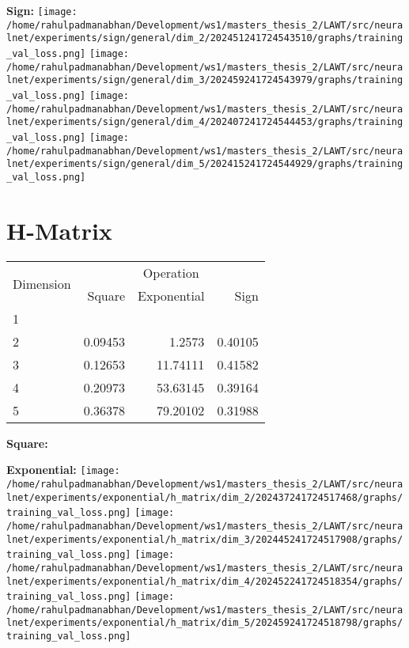 \documentclass{article}
\begin{document}
\textbf{Sign:}
\texttt{[image: /home/rahulpadmanabhan/Development/ws1/masters\_thesis\_2/LAWT/src/neuralnet/experiments/sign/general/dim\_2/202451241724543510/graphs/training\_val\_loss.png]}
\texttt{[image: /home/rahulpadmanabhan/Development/ws1/masters\_thesis\_2/LAWT/src/neuralnet/experiments/sign/general/dim\_3/202459241724543979/graphs/training\_val\_loss.png]}
\texttt{[image: /home/rahulpadmanabhan/Development/ws1/masters\_thesis\_2/LAWT/src/neuralnet/experiments/sign/general/dim\_4/202407241724544453/graphs/training\_val\_loss.png]}
\texttt{[image: /home/rahulpadmanabhan/Development/ws1/masters\_thesis\_2/LAWT/src/neuralnet/experiments/sign/general/dim\_5/202415241724544929/graphs/training\_val\_loss.png]}

\pagebreak
\section{H-Matrix}
\begin{tabular}{@{}lrrr@{}}
\toprule
\multirow{2}{*}{Dimension} & \multicolumn{3}{c}{Operation} \\
\cmidrule(l){2-4}
& Square & Exponential & Sign \\
\midrule
1 & & & \\
2 & 0.09453 & 1.2573 & 0.40105 \\
3 & 0.12653 & 11.74111 & 0.41582 \\
4 & 0.20973 & 53.63145 & 0.39164 \\
5 & 0.36378 & 79.20102 & 0.31988 \\
\bottomrule
\end{tabular}

\textbf{Square:}

\textbf{Exponential:}
\texttt{[image: /home/rahulpadmanabhan/Development/ws1/masters\_thesis\_2/LAWT/src/neuralnet/experiments/exponential/h\_matrix/dim\_2/202437241724517468/graphs/training\_val\_loss.png]}
\texttt{[image: /home/rahulpadmanabhan/Development/ws1/masters\_thesis\_2/LAWT/src/neuralnet/experiments/exponential/h\_matrix/dim\_3/202445241724517908/graphs/training\_val\_loss.png]}
\texttt{[image: /home/rahulpadmanabhan/Development/ws1/masters\_thesis\_2/LAWT/src/neuralnet/experiments/exponential/h\_matrix/dim\_4/202452241724518354/graphs/training\_val\_loss.png]}
\texttt{[image: /home/rahulpadmanabhan/Development/ws1/masters\_thesis\_2/LAWT/src/neuralnet/experiments/exponential/h\_matrix/dim\_5/202459241724518798/graphs/training\_val\_loss.png]}
\end{document}

